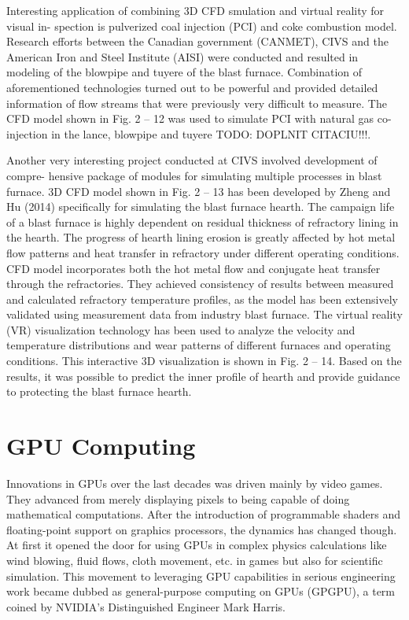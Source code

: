 Interesting application of combining 3D CFD smulation and virtual reality for visual in- spection is pulverized coal injection (PCI) and coke combustion model. Research efforts between the Canadian government (CANMET), CIVS and the American Iron and Steel Institute (AISI) were conducted and resulted in modeling of the blowpipe and tuyere of the blast furnace. Combination of aforementioned technologies turned out to be powerful and provided detailed information of flow streams that were previously very difficult to measure. The CFD model shown in Fig. 2 – 12 was used to simulate PCI with natural gas co-injection in the lance, blowpipe and tuyere TODO: DOPLNIT CITACIU!!!.

Another very interesting project conducted at CIVS involved development of compre- hensive package of modules for simulating multiple processes in blast furnace. 3D CFD model shown in Fig. 2 – 13 has been developed by Zheng and Hu (2014) specifically for simulating the blast furnace hearth. The campaign life of a blast furnace is highly dependent on residual thickness of refractory lining in the hearth. The progress of hearth lining erosion is greatly affected by hot metal flow patterns and heat transfer in refractory under different operating conditions. CFD model incorporates both the hot metal flow and conjugate heat transfer through the refractories. They achieved consistency of results between measured and calculated refractory temperature profiles, as the model has been extensively validated using measurement data from industry blast furnace. The virtual reality (VR) visualization technology has been used to analyze the velocity and temperature distributions and wear patterns of different furnaces and operating conditions. This interactive 3D visualization is shown in Fig. 2 – 14. Based on the results, it was possible to predict the inner profile of hearth and provide guidance to protecting the blast furnace hearth.



\section{GPU Computing}

\label{gpu-computing}
Innovations in GPUs over the last decades was driven mainly by video games. They advanced from merely displaying pixels to being capable of doing mathematical computations. After the introduction of programmable shaders and floating-point support on graphics processors, the dynamics has changed though. At first it opened the door for using GPUs in complex physics calculations like wind blowing, fluid flows, cloth movement, etc. in games but also for scientific simulation. This movement to leveraging GPU capabilities in serious engineering work became dubbed as general-purpose computing on GPUs (GPGPU), a term coined by NVIDIA's Distinguished Engineer Mark Harris.

